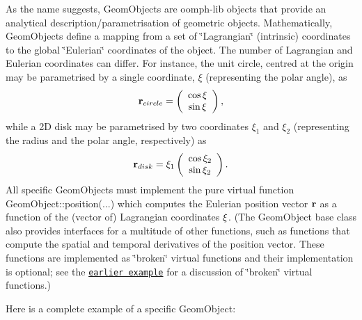 As the name suggests, {\ttfamily Geom\+Objects} are {\ttfamily oomph-\/lib} objects that provide an analytical description/parametrisation of geometric objects. Mathematically, {\ttfamily Geom\+Objects} define a mapping from a set of \char`\"{}\+Lagrangian\char`\"{} (intrinsic) coordinates to the global \char`\"{}\+Eulerian\char`\"{} coordinates of the object. The number of Lagrangian and Eulerian coordinates can differ. For instance, the unit circle, centred at the origin may be parametrised by a single coordinate, $ \xi $ (representing the polar angle), as \[ {\bf r}_{circle} = \left( \begin{array}{c} \cos \xi \\ \sin \xi \end{array} \right), \] while a 2D disk may be parametrised by two coordinates $ \xi_1 $ and $ \xi_2 $ (representing the radius and the polar angle, respectively) as \[ {\bf r}_{disk} = \xi_1 \left( \begin{array}{c} \cos \xi_2 \\ \sin \xi_2 \end{array} \right). \] All specific {\ttfamily Geom\+Objects} must implement the pure virtual function {\ttfamily Geom\+Object\+::position}(...) which computes the Eulerian position vector $ {\bf r}$ as a function of the (vector of) Lagrangian coordinates $ {\bf \xi}$. (The {\ttfamily Geom\+Object} base class also provides interfaces for a multitude of other functions, such as functions that compute the spatial and temporal derivatives of the position vector. These functions are implemented as \char`\"{}broken\char`\"{} virtual functions and their implementation is optional; see the \href{../../../../doc/poisson/two_d_poisson_flux_bc/html/index.html}{\tt earlier example} for a discussion of \char`\"{}broken\char`\"{} virtual functions.)

Here is a complete example of a specific {\ttfamily Geom\+Object\+:} 

